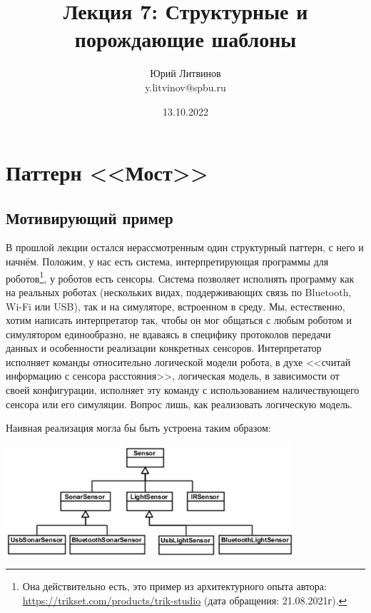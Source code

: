 \documentclass[a5paper]{article}
\title{Лекция 7: Структурные и порождающие шаблоны}
\author{Юрий Литвинов\\\small{y.litvinov@spbu.ru}}
\date{13.10.2022}
\begin{document}
\maketitle
\thispagestyle{empty}

\section{Паттерн <<Мост>>}

\subsection{Мотивирующий пример}

В прошлой лекции остался нерассмотренным один структурный паттерн, с него и начнём. Положим, у нас есть система, интерпретирующая программы для роботов\footnote{Она действительно есть, это пример из архитектурного опыта автора: \url{https://trikset.com/products/trik-studio} (дата обращения: 21.08.2021г).}, у роботов есть сенсоры. Система позволяет исполнять программу как на реальных роботах (нескольких видах, поддерживающих связь по Bluetooth, Wi-Fi или USB), так и на симуляторе, встроенном в среду. Мы, естественно, хотим написать интерпретатор так, чтобы он мог общаться с любым роботом и симулятором единообразно, не вдаваясь в специфику протоколов передачи данных и особенности реализации конкретных сенсоров. Интерпретатор исполняет команды относительно логической модели робота, в духе <<считай информацию с сенсора расстояния>>, логическая модель, в зависимости от своей конфигурации, исполняет эту команду с использованием наличествующего сенсора или его симуляции. Вопрос лишь, как реализовать логическую модель.

Наивная реализация могла бы быть устроена таким образом:

\begin{center}
    \includegraphics[width=0.8\textwidth]{noBridge.png}
\end{center}
\end{document}
